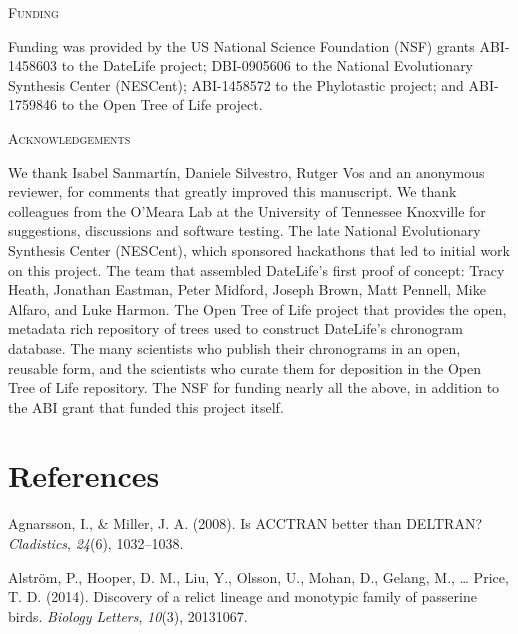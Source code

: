 \documentclass[english,man]{apa6}
\begin{document}
\begin{center}
\textsc{Funding}
\end{center}

Funding was provided by the US National Science Foundation (NSF) grants ABI-1458603 to the DateLife project; DBI-0905606 to the National Evolutionary Synthesis Center (NESCent); ABI-1458572 to the Phylotastic project; and ABI-1759846 to the Open Tree of Life project.

\begin{center}
\textsc{Acknowledgements}
\end{center}

We thank Isabel Sanmartín, Daniele Silvestro, Rutger Vos and an anonymous reviewer, for comments that greatly improved this manuscript.
We thank colleagues from the O'Meara Lab at the University
of Tennessee Knoxville for suggestions, discussions and software testing.
The late National Evolutionary Synthesis Center (NESCent), which sponsored hackathons that led to initial work on this project. The team that assembled DateLife's first proof of concept: Tracy Heath, Jonathan Eastman, Peter Midford, Joseph Brown, Matt Pennell, Mike Alfaro, and Luke Harmon.
The Open Tree of Life project that provides the open, metadata rich repository of
trees used to construct DateLife's chronogram database.
The many scientists who publish their chronograms in an open, reusable form, and the scientists who curate them for deposition in the Open Tree of Life repository.
The NSF for funding nearly all the above, in addition to the ABI grant that funded this project itself.

\newpage

\hypertarget{references}{%
\section{References}\label{references}}

\begingroup
\setlength{\parindent}{-0.5in}
\setlength{\leftskip}{0.5in}

\hypertarget{refs}{}
\leavevmode\hypertarget{ref-agnarsson2008acctran}{}%
Agnarsson, I., \& Miller, J. A. (2008). Is ACCTRAN better than DELTRAN? \emph{Cladistics}, \emph{24}(6), 1032--1038.

\leavevmode\hypertarget{ref-alstrom2014discovery}{}%
Alström, P., Hooper, D. M., Liu, Y., Olsson, U., Mohan, D., Gelang, M., \ldots{} Price, T. D. (2014). Discovery of a relict lineage and monotypic family of passerine birds. \emph{Biology Letters}, \emph{10}(3), 20131067.
\end{document}
